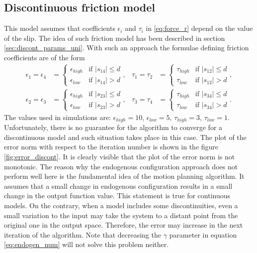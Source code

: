 \subsection{Discontinuous friction model}
This model assumes that coefficients $\epsilon_i$ and $\tau_i$ in \eqref{eq:force_r} depend
on the value of the slip. The idea of such friction model has been described
in section \ref{sec:discont_params_uni}. With such an approach the formulae defining
friction coefficients are of the form
\begin{equation*}
\begin{aligned}
\epsilon_1=\epsilon_4&=\begin{cases}
\epsilon_{high} &\mbox{if } |s_{14}| \leq d \\
\epsilon_{low} &\mbox{if } |s_{14}| > d
\end{cases}, &
\tau_1=\tau_2&=\begin{cases}
\tau_{high} &\mbox{if } |s_{12}| \leq d \\
\tau_{low} &\mbox{if } |s_{12}| > d
\end{cases},\\
\epsilon_2=\epsilon_3&=\begin{cases}
\epsilon_{high} &\mbox{if } |s_{23}| \leq d \\
\epsilon_{low} &\mbox{if } |s_{23}| > d
\end{cases}, &
\tau_3=\tau_4&=\begin{cases}
\tau_{high} &\mbox{if } |s_{34}| \leq d \\
\tau_{low} &\mbox{if } |s_{34}| > d
\end{cases}.
\end{aligned}
\end{equation*}
The values used in simulations are: $\epsilon_{high}=10$, $\epsilon_{low}=5$, $\tau_{high}=3$, $\tau_{low}=1$. Unfortunately, there is no guarantee for the algorithm to converge for a discontinuous model and such situation takes place in this case. The plot of the error norm with respect to the iteration number is shown in the figure \ref{fig:error_discont}. It is clearly visible that the plot of the error norm is not monotonic. The reason why the endogenous configuration approach does not perform well here is the fundamental idea of the motion planning algorithm. It assumes that a small change in endogenous configuration results in a small change in the output function value. This statement is true for continuous models. On the contrary, when a model includes some discontinuities, even a small variation to the input may take the system to a distant point from the original one in the output space. Therefore, the error may increase in the next iteration of the algorithm. Note that decreasing the $\gamma$ parameter in equation \eqref{eq:endogen_num} will not solve this problem neither.
